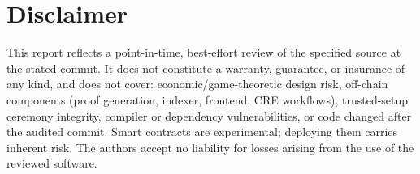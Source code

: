 \documentclass[11pt,a4paper]{article}
\begin{document}
\section{Disclaimer}
\label{sec:disclaimer}
\small
This report reflects a point-in-time, best-effort review of the specified source at
the stated commit. It does not constitute a warranty, guarantee, or insurance of any
kind, and does not cover: economic/game-theoretic design risk, off-chain components
(proof generation, indexer, frontend, CRE workflows), trusted-setup ceremony
integrity, compiler or dependency vulnerabilities, or code changed after the audited
commit. Smart contracts are experimental; deploying them carries inherent risk. The
authors accept no liability for losses arising from the use of the reviewed software.
\end{document}
